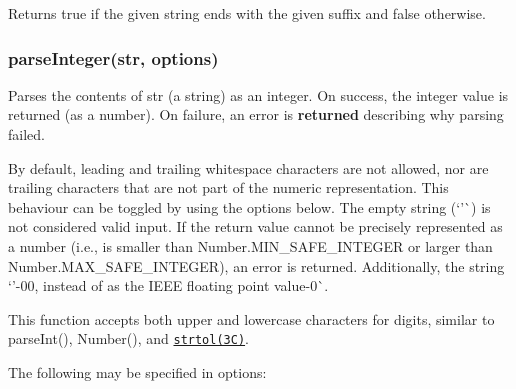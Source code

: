 Returns true if the given string ends with the given suffix and false otherwise.

\subsubsection*{parse\+Integer(str, options)}

Parses the contents of {\ttfamily str} (a string) as an integer. On success, the integer value is returned (as a number). On failure, an error is {\bfseries returned} describing why parsing failed.

By default, leading and trailing whitespace characters are not allowed, nor are trailing characters that are not part of the numeric representation. This behaviour can be toggled by using the options below. The empty string (`'\textquotesingle{}\`{}) is not considered valid input. If the return value cannot be precisely represented as a number (i.\+e., is smaller than {\ttfamily Number.\+M\+I\+N\+\_\+\+S\+A\+F\+E\+\_\+\+I\+N\+T\+E\+G\+ER} or larger than {\ttfamily Number.\+M\+A\+X\+\_\+\+S\+A\+F\+E\+\_\+\+I\+N\+T\+E\+G\+ER}), an error is returned. Additionally, the string `'-\/00{\ttfamily , instead of as the I\+E\+EE floating point value}-\/0\`{}.

This function accepts both upper and lowercase characters for digits, similar to {\ttfamily parse\+Int()}, {\ttfamily Number()}, and \href{https://illumos.org/man/3C/strtol}{\tt strtol(3\+C)}.

The following may be specified in {\ttfamily options}\+:

